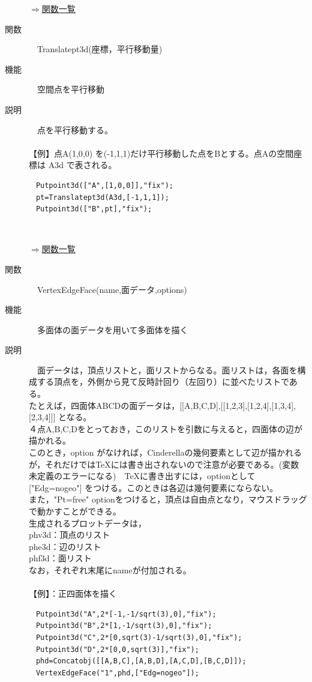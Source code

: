 \documentclass[papersize,a4paper,12pt,uplatex]{jsarticle}
\begin{document}
\begin{description}
\begin{flushright} \hyperlink{functionlist3d}{$\Rightarrow$関数一覧}\end{flushright}

\hypertarget{translatept3d}{}
\item[関数]　Translatept3d(座標，平行移動量)
\item[機能]　空間点を平行移動
\item[説明]　点を平行移動する。\\
　\\
【例】点A(1,0,0) を(-1,1,1)だけ平行移動した点をBとする。点Aの空間座標は A3d で表される。 
\begin{verbatim}
　Putpoint3d(["A",[1,0,0]],"fix");
　pt=Translatept3d(A3d,[-1,1,1]);
　Putpoint3d(["B",pt],"fix");
\end{verbatim}
　\\
\begin{flushright} \hyperlink{functionlist3d}{$\Rightarrow$関数一覧}\end{flushright}

\hypertarget{vertexedgeface}{}
\item[関数]　VertexEdgeFace(name,面データ,options)
\item[機能]　多面体の面データを用いて多面体を描く
\item[説明]　面データは，頂点リストと，面リストからなる。面リストは，各面を構成する頂点を，外側から見て反時計回り（左回り）に並べたリストである。\\
たとえば，四面体ABCDの面データは，[[A,B,C,D],[[1,2,3],[1,2,4],[1,3,4],[2,3,4]]] となる。\\
４点A,B,C,Dをとっておき，このリストを引数に与えると，四面体の辺が描かれる。\\
このとき，option がなければ，Cinderellaの幾何要素として辺が描かれるが，それだけではTeXには書き出されないので注意が必要である。(変数未定義のエラーになる)　TeXに書き出すには，optionとして ["Edg=nogeo"] をつける。このときは各辺は幾何要素にならない。\\
また，"Pt=free" optionをつけると，頂点は自由点となり，マウスドラッグで動かすことができる。\\
生成されるプロットデータは，\\
phv3d：頂点のリスト\\
phe3d：辺のリスト\\
phf3d：面リスト\\
なお，それぞれ末尾にnameが付加される。\\
　\\
【例】：正四面体を描く
\begin{verbatim}
　Putpoint3d("A",2*[-1,-1/sqrt(3),0],"fix");
　Putpoint3d("B",2*[1,-1/sqrt(3),0],"fix");
　Putpoint3d("C",2*[0,sqrt(3)-1/sqrt(3),0],"fix");
　Putpoint3d("D",2*[0,0,sqrt(3)],"fix");
　phd=Concatobj([[A,B,C],[A,B,D],[A,C,D],[B,C,D]]);
　VertexEdgeFace("1",phd,["Edg=nogeo"]);
\end{verbatim}
　　　　


\end{description}
\end{document}
